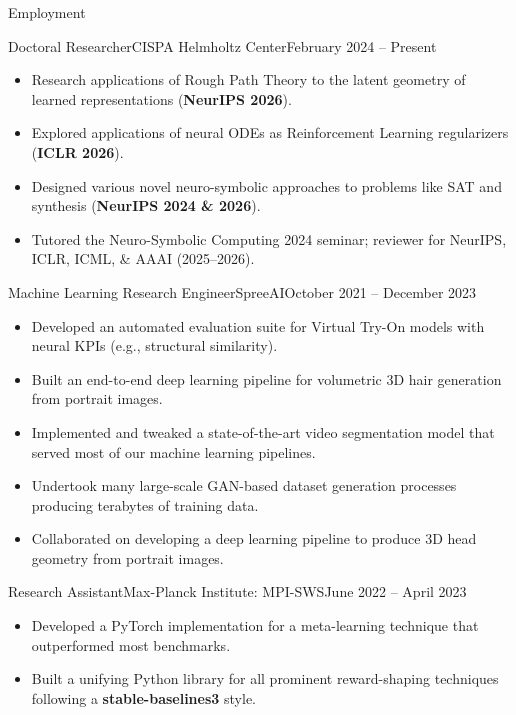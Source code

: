 \documentclass[]{mcdowellcv}
\begin{document}
        \vspace{-0.5em}
	\begin{cvsection}{Employment}

            \begin{cvsubsection}{Doctoral Researcher}{CISPA Helmholtz Center}{February 2024 -- Present}	
			\begin{itemize}
                \item Research applications of Rough Path Theory to the latent geometry of learned representations (\textbf{NeurIPS 2026}).
				\item Explored applications of neural ODEs as Reinforcement Learning regularizers (\textbf{ICLR 2026}).
				\item Designed various novel neuro-symbolic approaches to problems like SAT and synthesis (\textbf{NeurIPS 2024 \& 2026}).
				\item Tutored the Neuro-Symbolic Computing 2024 seminar; reviewer for NeurIPS, ICLR, ICML, \& AAAI (2025--2026).
			\end{itemize}
		\end{cvsubsection}
        \begin{cvsubsection}{Machine Learning Research Engineer}{SpreeAI}{October 2021 -- December 2023}	
			\begin{itemize}
                \item Developed an automated evaluation suite for Virtual Try-On models with neural KPIs (e.g., structural similarity).
                \item Built an end-to-end deep learning pipeline for volumetric 3D hair generation from portrait images.
                \item Implemented and tweaked a state-of-the-art video segmentation model that served most of our machine learning pipelines.
                \item Undertook many large-scale GAN-based dataset generation processes producing terabytes of training data.
                \item Collaborated on developing a deep learning pipeline to produce 3D head geometry from portrait images.
			\end{itemize}
		\end{cvsubsection}

		\begin{cvsubsection}{Research Assistant}{Max-Planck Institute: MPI-SWS}{June 2022 -- April 2023}			
			\begin{itemize}
				\item Developed a PyTorch implementation for a meta-learning technique that outperformed most benchmarks.
                \item Built a unifying Python library for all prominent reward-shaping techniques following a \textbf{stable-baselines3} style.
			\end{itemize}
		\end{cvsubsection}
		

\end{cvsection}
\end{document}
